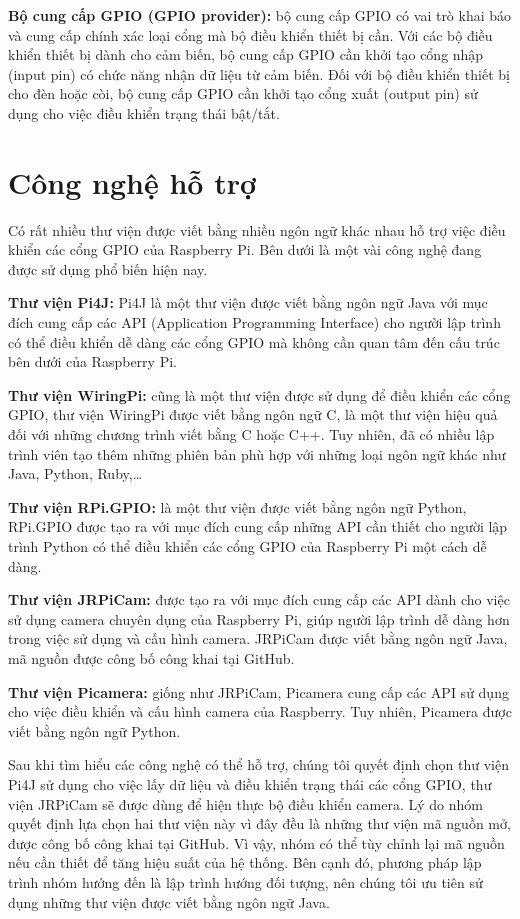 \documentclass[12pt,a4paper,oneside]{extbook}
\begin{document}
\textbf{Bộ cung cấp GPIO (GPIO provider):} bộ cung cấp GPIO có vai trò khai báo và cung cấp chính xác loại cổng mà bộ điều khiển thiết bị cần. Với các bộ điều khiển thiết bị dành cho cảm biến, bộ cung cấp GPIO cần khởi tạo cổng nhập (input pin) có chức năng nhận dữ liệu từ cảm biến. Đối với bộ điều khiển thiết bị cho đèn hoặc còi, bộ cung cấp GPIO cần khởi tạo cổng xuất (output pin) sử dụng cho việc điều khiển trạng thái bật/tắt.

\section{Công nghệ hỗ trợ}
Có rất nhiều thư viện được viết bằng nhiều ngôn ngữ khác nhau hỗ trợ việc điều khiển các cổng GPIO của Raspberry Pi. Bên dưới là một vài công nghệ đang được sử dụng phổ biến hiện nay.

\textbf{Thư viện Pi4J:} Pi4J là một thư viện được viết bằng ngôn ngữ Java với mục đích cung cấp các API (Application Programming Interface) cho người lập trình có thể điều khiển dễ dàng các cổng GPIO mà không cần quan tâm đến cấu trúc bên dưới của Raspberry Pi.

\textbf{Thư viện WiringPi:} cũng là một thư viện được sử dụng để điều khiển các cổng GPIO, thư viện WiringPi được viết bằng ngôn ngữ C, là một thư viện hiệu quả đối với những chương trình viết bằng C hoặc C++. Tuy nhiên, đã có nhiều lập trình viên tạo thêm những phiên bản phù hợp với những loại ngôn ngữ khác như Java, Python, Ruby,\dots

\textbf{Thư viện RPi.GPIO:} là một thư viện được viết bằng ngôn ngữ Python, RPi.GPIO được tạo ra với mục đích cung cấp những API cần thiết cho người lập trình Python có thể điều khiển các cổng GPIO của Raspberry Pi một cách dễ dàng.

\textbf{Thư viện JRPiCam:} được tạo ra với mục đích cung cấp các API dành cho việc sử dụng camera chuyên dụng của Raspberry Pi, giúp người lập trình dễ dàng hơn trong việc sử dụng và cấu hình camera. JRPiCam được viết bằng ngôn ngữ Java, mã nguồn được công bố công khai tại GitHub.

\textbf{Thư viện Picamera:} giống như JRPiCam, Picamera cung cấp các API sử dụng cho việc điều khiển và cấu hình camera của Raspberry. Tuy nhiên, Picamera được viết bằng ngôn ngữ Python.

Sau khi tìm hiểu các công nghệ có thể hỗ trợ, chúng tôi quyết định chọn thư viện Pi4J sử dụng cho việc lấy dữ liệu và điều khiển trạng thái các cổng GPIO, thư viện JRPiCam sẽ được dùng để hiện thực bộ điều khiển camera. Lý do nhóm quyết định lựa chọn hai thư viện này vì đây đều là những thư viện mã nguồn mở, được công bố công khai tại GitHub. Vì vậy, nhóm có thể tùy chỉnh lại mã nguồn nếu cần thiết để tăng hiệu suất của hệ thống. Bên cạnh đó, phương pháp lập trình nhóm hướng đến là lập trình hướng đối tượng, nên chúng tôi ưu tiên sử dụng những thư viện được viết bằng ngôn ngữ Java.
\end{document}
